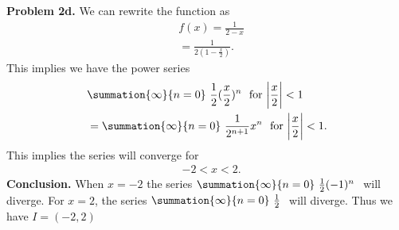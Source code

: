 \documentclass{report}
\begin{document}
   \pagebreak \bigbreak \noindent 
   \textbf{Problem 2d.} We can rewrite the function as 
   \begin{align*}
       &f(x) = \frac{1}{2-x} \\
       &=\frac{1}{2(1-\frac{x}{2})}
   .\end{align*}
   \bigbreak \noindent 
   This implies we have the power series 
   \begin{align*}
       &\summation{\infty}{n=0}\ \frac{1}{2}(\frac{x}{2})^{n}\  \text{ for $\bigg\lvert \frac{x}{2} \bigg\rvert < 1$}\\
       &=\summation{\infty}{n=0}\ \frac{1}{2^{n+1}}x^{n}\ \text{ for $\bigg\lvert \frac{x}{2} \bigg\rvert < 1$}
   .\end{align*}
   This implies the series will converge for 
   \begin{align*}
       &-2 < x < 2
   .\end{align*}
   \bigbreak \noindent 
   \textbf{Conclusion.} When $x=-2$ the series $\summation{\infty}{n=0}\ \frac{1}{2}(-1)^{n}\  $ will diverge. For $x=2 $, the series $\summation{\infty}{n=0}\ \frac{1}{2}\  $ will diverge. Thus we have $I=(-2,2) $







    





    
    
\end{document}
